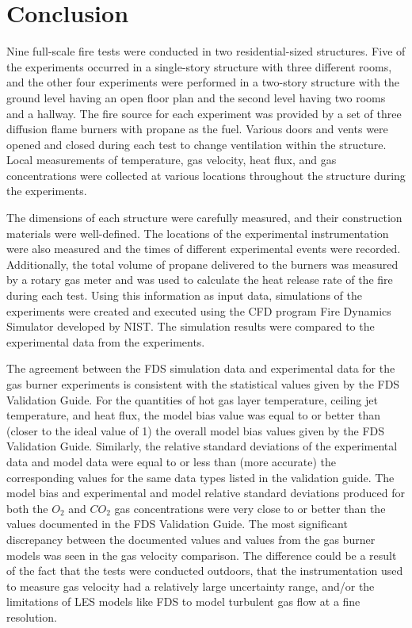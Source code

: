 
\renewcommand{\thechapter}{6}

\chapter{Conclusion}

Nine full-scale fire tests were conducted in two residential-sized structures. Five of the experiments occurred in a single-story structure with three different rooms, and the other four experiments were performed in a two-story structure with the ground level having an open floor plan and the second level having two rooms and a hallway. The fire source for each experiment was provided by a set of three diffusion flame burners with propane as the fuel. Various doors and vents were opened and closed during each test to change ventilation within the structure. Local measurements of temperature, gas velocity, heat flux, and gas concentrations were collected at various locations throughout the structure during the experiments. 

The dimensions of each structure were carefully measured, and their construction materials were well-defined. The locations of the experimental instrumentation were also measured and the times of different experimental events were recorded. Additionally, the total volume of propane delivered to the burners was measured by a rotary gas meter and was used to calculate the heat release rate of the fire during each test. Using this information as input data, simulations of the experiments were created and executed using the CFD program Fire Dynamics Simulator developed by NIST. The simulation results were compared to the experimental data from the experiments.

The agreement between the FDS simulation data and experimental data for the gas burner experiments is consistent with the statistical values given by the FDS Validation Guide. For the quantities of hot gas layer temperature, ceiling jet temperature, and heat flux, the model bias value was equal to or better than (closer to the ideal value of 1) the overall model bias values given by the FDS Validation Guide. Similarly, the relative standard deviations of the experimental data and model data were equal to or less than (more accurate) the corresponding values for the same data types listed in the validation guide. The model bias and experimental and model relative standard deviations produced for both the $O_2$ and $CO_2$ gas concentrations were very close to or better than the values documented in the FDS Validation Guide. The most significant discrepancy between the documented values and values from the gas burner models was seen in the gas velocity comparison. The difference could be a result of the fact that the tests were conducted outdoors, that the instrumentation used to measure gas velocity had a relatively large uncertainty range, and/or the limitations of LES models like FDS to model turbulent gas flow at a fine resolution.

